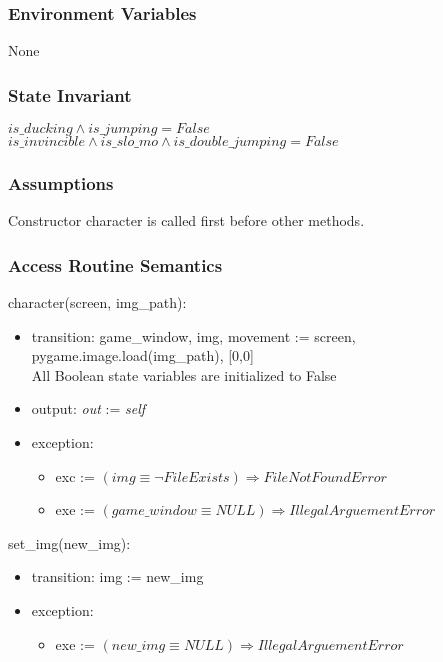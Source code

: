 \documentclass[12pt]{article}
\begin{document}
\subsubsection* {Environment Variables}
None
\subsubsection* {State Invariant}

$is\_ducking \land is\_jumping = False$\\
$is\_invincible \land is\_slo\_mo \land is\_double\_jumping = False$\\
\subsubsection* {Assumptions}

Constructor character is called first before other methods.

\subsubsection* {Access Routine Semantics}

\noindent character(screen, img\_path):
\begin{itemize}
\item transition: game\_window, img, movement := screen, pygame.image.load(img\_path), [0,0]\\ All Boolean state variables are initialized to False
\item output: \textit{out} := \textit{self}
\item exception: 
    \begin{itemize}[]
        \item exc := $(img \equiv \neg FileExists) \Rightarrow FileNotFoundError$
        \item exe := $(game\_window \equiv NULL) \Rightarrow IllegalArguementError$
    \end{itemize}
\end{itemize}

\noindent set\_img(new\_img):
\begin{itemize}
    \item transition: img := new\_img
\item exception: 
    \begin{itemize}[]
        \item exe := $(new\_img \equiv NULL) \Rightarrow IllegalArguementError$
    \end{itemize}    
\end{itemize}
\end{document}
